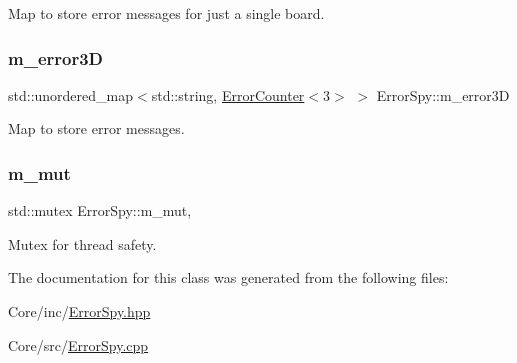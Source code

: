 Map to store error messages for just a single board. 

\mbox{\label{class_error_spy_af7de57cb54056410117531acd071ee38}} 
\subsubsection{\texorpdfstring{m\+\_\+error3D}{m\_error3D}}
{\footnotesize\ttfamily std\+::unordered\+\_\+map$<$std\+::string, \hyperlink{class_error_counter}{Error\+Counter}$<$3$>$ $>$ Error\+Spy\+::m\+\_\+error3D\hspace{0.3cm}{\ttfamily [private]}}



Map to store error messages. 

\mbox{\label{class_error_spy_ae7d03be7562c1eb3ed4de48e33d89070}} 
\subsubsection{\texorpdfstring{m\+\_\+mut}{m\_mut}}
{\footnotesize\ttfamily std\+::mutex Error\+Spy\+::m\+\_\+mut\hspace{0.3cm}{\ttfamily [mutable]}, {\ttfamily [private]}}



Mutex for thread safety. 



The documentation for this class was generated from the following files\+:\begin{DoxyCompactItemize}
\item 
Core/inc/\hyperlink{_error_spy_8hpp}{Error\+Spy.\+hpp}\item 
Core/src/\hyperlink{_error_spy_8cpp}{Error\+Spy.\+cpp}\end{DoxyCompactItemize}
